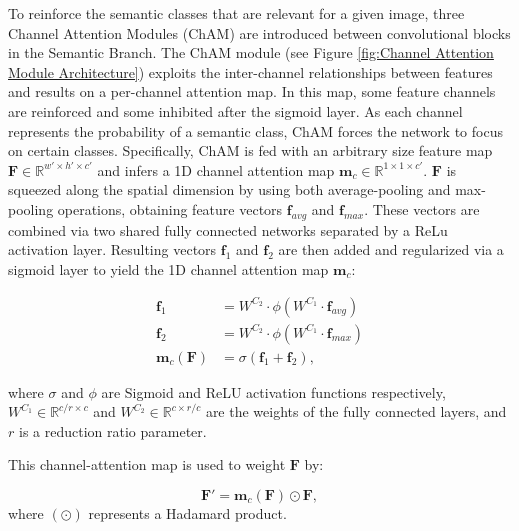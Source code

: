 \documentclass[review, 3p, sort&compress]{elsarticle}
\begin{document}
To reinforce the semantic classes that are relevant for a given image, three Channel Attention Modules (ChAM) \cite{woo2018cbam} are introduced between convolutional blocks in the Semantic Branch. The ChAM module (see Figure \ref{fig:Channel Attention Module Architecture}) exploits the inter-channel relationships between features and results on a per-channel attention map. In this map, some feature channels are reinforced and some inhibited after the sigmoid layer. As each channel represents the probability of a semantic class, ChAM forces the network to focus on certain classes. Specifically, ChAM is fed with an arbitrary size feature map \(\textbf{F} \in \mathbb{R}^{w' \times h' \times c'}\) and infers a 1D channel attention map \(\textbf{m}_c \in \mathbb{R}^{1 \times 1 \times c'}\). \(\textbf{F}\) is squeezed along the spatial dimension by using both average-pooling and max-pooling operations, obtaining feature vectors \(\textbf{f}_{avg}\) and \(\textbf{f}_{max}\). These vectors are combined via two shared fully connected networks separated by a ReLu activation layer. Resulting vectors \(\textbf{f}_{1}\) and \(\textbf{f}_{2}\) are then added and regularized via a sigmoid layer to yield the 1D channel attention map \(\textbf{m}_c\):

\begin{equation}\label{CAM1}
    \begin{split}
        \textbf{f}_1 &= W^{C_2} \cdot \phi ( W^{C_1} \cdot \textbf{f}_{avg} ) \\
        \textbf{f}_2 &= W^{C_2} \cdot \phi ( W^{C_1} \cdot \textbf{f}_{max} ) \\
        \textbf{m}_c(\textbf{F}) &= \sigma (\textbf{f}_1 + \textbf{f}_2),
    \end{split}
\end{equation}

where \(\sigma\) and \(\phi\) are Sigmoid and ReLU activation functions respectively, \(W^{C_1} \in \mathbb{R}^{c/r \times c}\) and \(W^{C_2} \in \mathbb{R}^{c\times r / c}\) are the weights of the fully connected layers, and \(r\) is a reduction ratio parameter.

This channel-attention map is used to weight \(\textbf{F}\) by: 

\begin{equation}\label{CAM2}
        \textbf{F}'= \textbf{m}_c(\textbf{F}) \odot \textbf{F},
\end{equation}
where \((\odot)\) represents a Hadamard product.
\end{document}
